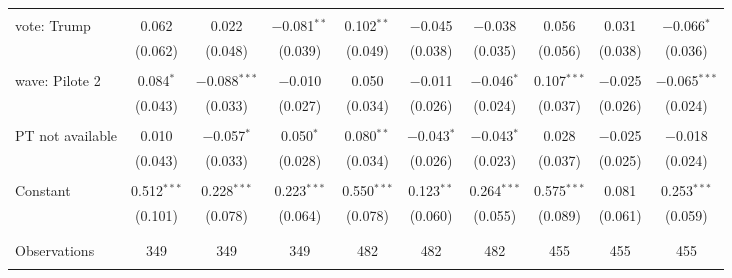 \begin{tabular}{@{\extracolsep{5pt}}lccccccccc}
  & & & & & & & & & \\ 
 vote: Trump & 0.062 & 0.022 & $-$0.081$^{**}$ & 0.102$^{**}$ & $-$0.045 & $-$0.038 & 0.056 & 0.031 & $-$0.066$^{*}$ \\ 
  & (0.062) & (0.048) & (0.039) & (0.049) & (0.038) & (0.035) & (0.056) & (0.038) & (0.036) \\ 
  & & & & & & & & & \\ 
 wave: Pilote 2 & 0.084$^{*}$ & $-$0.088$^{***}$ & $-$0.010 & 0.050 & $-$0.011 & $-$0.046$^{*}$ & 0.107$^{***}$ & $-$0.025 & $-$0.065$^{***}$ \\ 
  & (0.043) & (0.033) & (0.027) & (0.034) & (0.026) & (0.024) & (0.037) & (0.026) & (0.024) \\ 
  & & & & & & & & & \\ 
 PT not available & 0.010 & $-$0.057$^{*}$ & 0.050$^{*}$ & 0.080$^{**}$ & $-$0.043$^{*}$ & $-$0.043$^{*}$ & 0.028 & $-$0.025 & $-$0.018 \\ 
  & (0.043) & (0.033) & (0.028) & (0.034) & (0.026) & (0.023) & (0.037) & (0.025) & (0.024) \\ 
  & & & & & & & & & \\ 
 Constant & 0.512$^{***}$ & 0.228$^{***}$ & 0.223$^{***}$ & 0.550$^{***}$ & 0.123$^{**}$ & 0.264$^{***}$ & 0.575$^{***}$ & 0.081 & 0.253$^{***}$ \\ 
  & (0.101) & (0.078) & (0.064) & (0.078) & (0.060) & (0.055) & (0.089) & (0.061) & (0.059) \\ 
  & & & & & & & & & \\ 
\hline \\[-1.8ex] 

Observations & 349 & 349 & 349 & 482 & 482 & 482 & 455 & 455 & 455 \\ 
\hline 
\hline \\[-1.8ex] 
\end{tabular} 